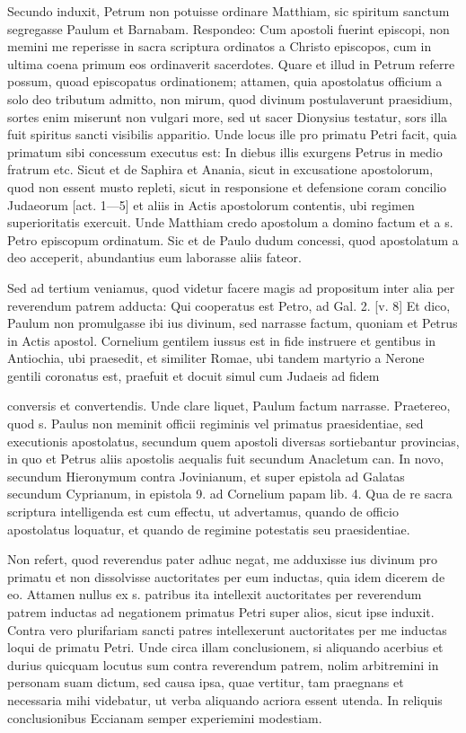 Secundo induxit, Petrum non potuisse ordinare Matthiam, sic spiritum sanctum segregasse Paulum et Barnabam. Respondeo: Cum apostoli fuerint episcopi, non memini me reperisse in sacra scriptura ordinatos a Christo episcopos, cum in ultima coena primum eos ordinaverit sacerdotes. Quare et illud in Petrum referre possum, quoad episcopatus ordinationem; attamen, quia apostolatus officium a solo deo tributum admitto, non mirum, quod divinum postulaverunt praesidium, sortes enim miserunt non vulgari more, sed ut sacer Dionysius testatur, sors illa fuit spiritus sancti visibilis apparitio. Unde locus ille pro primatu Petri facit, quia primatum sibi concessum executus est: In diebus illis exurgens Petrus in medio fratrum etc. Sicut et de Saphira et Anania, sicut in excusatione apostolorum, quod non essent musto repleti, sicut in responsione et defensione coram concilio Judaeorum [act. 1—5] et aliis in Actis apostolorum contentis, ubi regimen superioritatis exercuit. Unde Matthiam credo apostolum a domino factum et a s. Petro episcopum ordinatum. Sic et de Paulo dudum concessi, quod apostolatum a deo acceperit, abundantius eum laborasse aliis fateor.

Sed ad tertium veniamus, quod videtur facere magis ad propositum inter alia per reverendum patrem adducta: Qui cooperatus est Petro, ad Gal. 2. [v. 8] Et dico, Paulum non promulgasse ibi ius divinum, sed narrasse factum, quoniam et Petrus in Actis apostol. Cornelium gentilem iussus est in fide instruere et gentibus in Antiochia, ubi praesedit, et similiter Romae, ubi tandem martyrio a Nerone gentili coronatus est, praefuit et docuit simul \marginpar{\small[318]} cum Judaeis ad fidem

conversis et convertendis. Unde clare liquet, Paulum factum narrasse. Praetereo, quod s. Paulus non meminit officii regiminis vel primatus praesidentiae, sed executionis apostolatus, secundum quem apostoli diversas sortiebantur provincias, in quo et Petrus aliis apostolis aequalis fuit secundum Anacletum can. In novo, secundum Hieronymum contra Jovinianum, et super epistola ad Galatas secundum Cyprianum, in epistola 9. ad Cornelium papam lib. 4. Qua de re sacra scriptura intelligenda est cum effectu, ut advertamus, quando de officio apostolatus loquatur, et quando de regimine potestatis seu praesidentiae.

Non refert, quod reverendus pater adhuc negat, me adduxisse ius divinum pro primatu et non dissolvisse auctoritates per eum inductas, quia idem dicerem de eo. Attamen nullus ex s. patribus ita intellexit auctoritates per reverendum patrem inductas ad negationem primatus Petri super alios, sicut ipse induxit. Contra vero plurifariam sancti patres intellexerunt auctoritates per me inductas loqui de primatu Petri. Unde circa illam conclusionem, si aliquando acerbius et durius quicquam locutus sum contra reverendum patrem, nolim arbitremini in personam suam dictum, sed causa ipsa, quae vertitur, tam praegnans et necessaria mihi videbatur, ut verba aliquando acriora essent utenda. In reliquis conclusionibus Eccianam semper experiemini modestiam.

